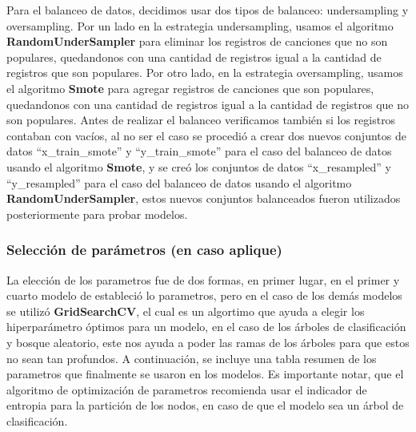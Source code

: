 \documentclass[
  letterpaper,
  DIV=11,
  numbers=noendperiod]{scrartcl}
\begin{document}
Para el balanceo de datos, decidimos usar dos tipos de balanceo:
undersampling y oversampling. Por un lado en la estrategia
undersampling, usamos el algoritmo \textbf{RandomUnderSampler} para
eliminar los registros de canciones que no son populares, quedandonos
con una cantidad de registros igual a la cantidad de registros que son
populares. Por otro lado, en la estrategia oversampling, usamos el
algoritmo \textbf{Smote} para agregar registros de canciones que son
populares, quedandonos con una cantidad de registros igual a la cantidad
de registros que no son populares. Antes de realizar el balanceo
verificamos también si los registros contaban con vacíos, al no ser el
caso se procedió a crear dos nuevos conjuntos de datos
``x\_train\_smote'' y ``y\_train\_smote'' para el caso del balanceo de
datos usando el algoritmo \textbf{Smote}, y se creó los conjuntos de
datos ``x\_resampled'' y ``y\_resampled'' para el caso del balanceo de
datos usando el algoritmo \textbf{RandomUnderSampler}, estos nuevos
conjuntos balanceados fueron utilizados posteriormente para probar
modelos.

\hypertarget{selecciuxf3n-de-paruxe1metros-en-caso-aplique}{%
\subsubsection{Selección de parámetros (en caso
aplique)}\label{selecciuxf3n-de-paruxe1metros-en-caso-aplique}}

La elección de los parametros fue de dos formas, en primer lugar, en el
primer y cuarto modelo de estableció lo parametros, pero en el caso de
los demás modelos se utilizó \textbf{GridSearchCV}, el cual es un
algortimo que ayuda a elegir los hiperparámetro óptimos para un modelo,
en el caso de los árboles de clasificación y bosque aleatorio, este nos
ayuda a poder las ramas de los árboles para que estos no sean tan
profundos. A continuación, se incluye una tabla resumen de los
parametros que finalmente se usaron en los modelos. Es importante notar,
que el algoritmo de optimización de parametros recomienda usar el
indicador de entropia para la partición de los nodos, en caso de que el
modelo sea un árbol de clasificación.
\end{document}
